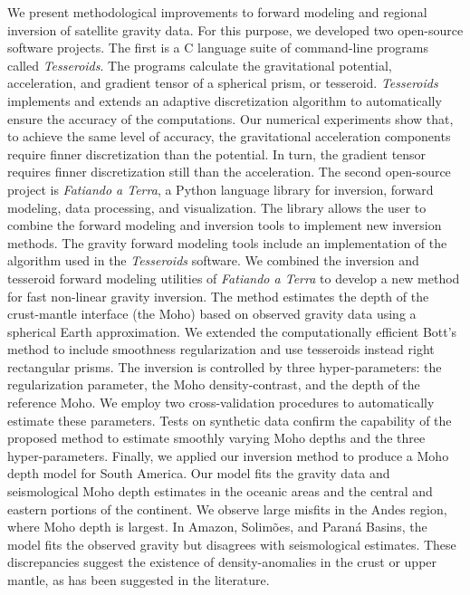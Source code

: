 \begin{foreignabstract}

We present methodological improvements to forward modeling and regional
inversion of satellite gravity data.
For this purpose, we developed two open-source software projects.
The first is a C language suite of command-line programs called
\textit{Tesseroids}.
The programs calculate the gravitational potential, acceleration, and gradient
tensor of a spherical prism, or tesseroid.
\textit{Tesseroids} implements and extends an adaptive discretization algorithm
to automatically ensure the accuracy of the computations.
Our numerical experiments show that, to achieve the same level of accuracy, the
gravitational acceleration components require finner discretization than the
potential.
In turn, the gradient tensor requires finner discretization still than the
acceleration.
The second open-source project is \textit{Fatiando a Terra}, a Python language
library for inversion, forward modeling, data processing, and visualization.
The library allows the user to combine the forward modeling and inversion tools
to implement new inversion methods.
The gravity forward modeling tools include an implementation of the
algorithm used in the \textit{Tesseroids} software.
We combined the inversion and tesseroid forward modeling utilities of
\textit{Fatiando a Terra} to develop a new method for fast non-linear gravity
inversion.
The method estimates the depth of the crust-mantle interface (the Moho) based
on observed gravity data using a spherical Earth approximation.
We extended the computationally efficient Bott's method to include smoothness
regularization and use tesseroids instead right rectangular prisms.
The inversion is controlled by three hyper-parameters: the regularization
parameter, the Moho density-contrast, and the depth of the reference Moho.
We employ two cross-validation procedures to automatically estimate these
parameters.
Tests on synthetic data confirm the capability of the proposed method to
estimate smoothly varying Moho depths and the three hyper-parameters.
Finally, we applied our inversion method to produce a Moho depth model for
South America.
Our model fits the gravity data and seismological Moho depth estimates
in the oceanic areas and the central and eastern portions of the continent.
We observe large misfits in the Andes region, where Moho depth is largest.
In Amazon, Solimões, and Paraná Basins, the model fits the observed gravity
but disagrees with seismological estimates.
These discrepancies suggest the existence of density-anomalies in the crust or
upper mantle, as has been suggested in the literature.
\end{foreignabstract}
